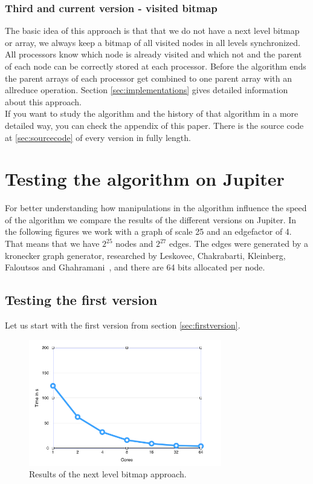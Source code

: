 \documentclass[12pt,a4paper]{article}
\begin{document}
\subsubsection{Third and current version - visited bitmap}
\label{sec:thirdversion}

The basic idea of this approach is that that we do not have a next level bitmap or array, we always keep a bitmap of all visited nodes in all levels synchronized. All processors know which node is already visited and which not and the parent of each node can be correctly stored at each processor. Before the algorithm ends the parent arrays of each processor get combined to one parent array with an allreduce operation. Section \ref{sec:implementations} gives detailed information about this approach.\\
If you want to study the algorithm and the history of that algorithm in a more detailed way, you can check the appendix of this paper. There is the source code at \ref{sec:sourcecode} of every version in fully length.

\section{Testing the algorithm on Jupiter}
\label{sec:testing}

For better understanding how manipulations in the algorithm influence the speed of the algorithm we compare the results of the different versions on Jupiter. In the following figures we work with a graph of scale 25 and an edgefactor of 4. That means that we have \(2^{25}\) nodes and \(2^{27}\) edges. The edges were generated by a kronecker graph generator, researched by Leskovec, Chakrabarti, Kleinberg, Faloutsos and Ghahramani~\cite{kronecker}, and there are 64 bits allocated per node.

\subsection{Testing the first version}

Let us start with the first version from section \ref{sec:firstversion}.

\begin{figure}[!ht]
   \centering
   \includegraphics[width=0.75\textwidth]{next_level}
   \caption{Results of the next level bitmap approach.}
   \label{fig:nextbitmap}
\end{figure}
\end{document}
